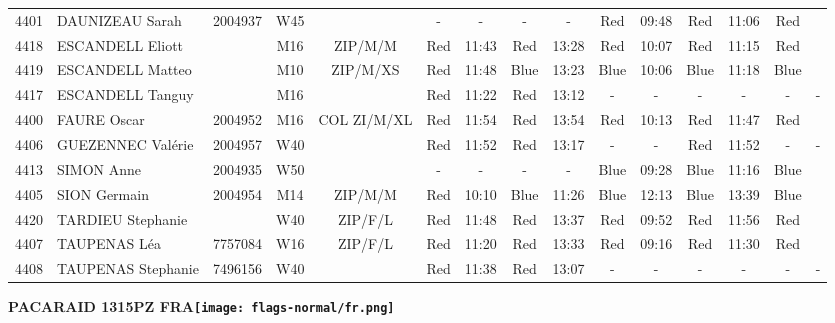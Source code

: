\documentclass{report}
\begin{document}
\begin{longtable}{|c|l|r|c|c|*{5}{cc|}}
    4401 & DAUNIZEAU Sarah & 2004937 & W45 &   & - &  - & - &  - & Red & 09:48 & Red & 11:06 & Red &  \\
    4418 & ESCANDELL Eliott &  & M16 & ZIP/M/M & Red & 11:43 & Red & 13:28 & Red & 10:07 & Red & 11:15 & Red &  \\
    4419 & ESCANDELL Matteo &  & M10 & ZIP/M/XS & Red & 11:48 & Blue & 13:23 & Blue & 10:06 & Blue & 11:18 & Blue &  \\
    4417 & ESCANDELL Tanguy &  & M16 &   & Red & 11:22 & Red & 13:12 & - &  - & - &  - & - &  -\\
    4400 & FAURE Oscar & 2004952 & M16 & COL ZI/M/XL & Red & 11:54 & Red & 13:54 & Red & 10:13 & Red & 11:47 & Red &  \\
    4406 & GUEZENNEC Valérie & 2004957 & W40 &   & Red & 11:52 & Red & 13:17 & - &  - & Red & 11:52 & - &  -\\
    4413 & SIMON Anne & 2004935 & W50 &   & - &  - & - &  - & Blue & 09:28 & Blue & 11:16 & Blue &  \\
    4405 & SION Germain & 2004954 & M14 & ZIP/M/M & Red & 10:10 & Blue & 11:26 & Blue & 12:13 & Blue & 13:39 & Blue &  \\
    4420 & TARDIEU Stephanie &  & W40 & ZIP/F/L & Red & 11:48 & Red & 13:37 & Red & 09:52 & Red & 11:56 & Red &  \\
    4407 & TAUPENAS Léa & 7757084 & W16 & ZIP/F/L & Red & 11:20 & Red & 13:33 & Red & 09:16 & Red & 11:30 & Red &  \\
    4408 & TAUPENAS Stephanie & 7496156 & W40 &   & Red & 11:38 & Red & 13:07 & - &  - & - &  - & - &  -\\
  \end{longtable}
\newpage
  \Huge \centering \bfseries PACARAID 1315PZ FRA\normalfont \footnotesize \sffamily \hfill \texttt{[image: flags-normal/fr.png]} \newline 
\end{document}
